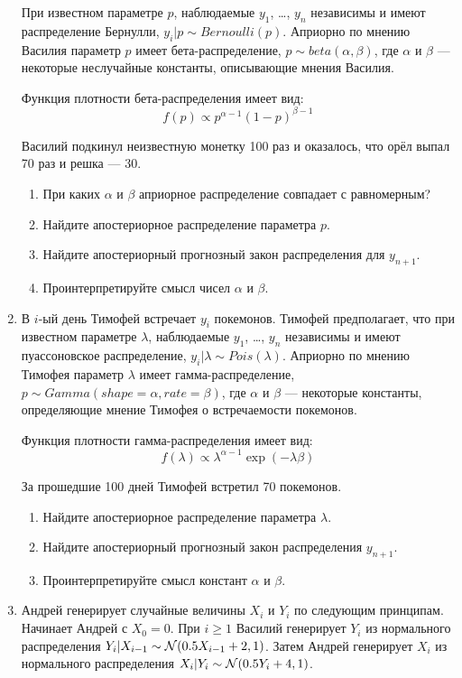 \documentclass[12pt, a4paper]{article}
\begin{document}
\begin{enumerate}
При известном параметре $p$, наблюдаемые $y_1$, \ldots, $y_n$ независимы и имеют распределение Бернулли, $y_i|p \sim Bernoulli(p)$. Априорно по мнению Василия параметр $p$ имеет бета-распределение, $p \sim beta(\alpha, \beta)$, где $\alpha$ и $\beta$ — некоторые неслучайные константы, описывающие мнения Василия.

Функция плотности бета-распределения имеет вид:
\[
f(p) \propto p^{\alpha - 1}(1-p)^{\beta-1}
\]

Василий подкинул неизвестную монетку 100 раз и оказалось, что орёл выпал 70 раз и решка — 30.

\begin{enumerate}
  \item При каких $\alpha$ и $\beta$ априорное распределение совпадает с равномерным?
  \item Найдите апостериорное распределение параметра $p$.
  \item Найдите апостериорный прогнозный закон распределения для $y_{n+1}$.
  \item Проинтерпретируйте смысл чисел $\alpha$ и $\beta$.
\end{enumerate}

\item В $i$-ый день Тимофей встречает $y_i$ покемонов. Тимофей предполагает, что при известном параметре $\lambda$, наблюдаемые $y_1$, \ldots, $y_n$ независимы и имеют пуассоновское распределение, $y_i|\lambda \sim Pois(\lambda)$. Априорно по мнению Тимофея параметр $\lambda$ имеет гамма-распределение, $p \sim Gamma(shape=\alpha, rate=\beta)$, где $\alpha$ и $\beta$ — некоторые константы, определяющие мнение Тимофея о встречаемости покемонов.

Функция плотности гамма-распределения имеет вид:
\[
f(\lambda) \propto \lambda^{\alpha - 1}\exp(-\lambda\beta)
\]

За прошедшие 100 дней Тимофей встретил 70 покемонов.


\begin{enumerate}
  \item Найдите апостериорное распределение параметра $\lambda$.
  \item Найдите апостериорный прогнозный закон распределения $y_{n+1}$.
  \item Проинтерпретируйте смысл констант $\alpha$ и $\beta$.
\end{enumerate}


\item Андрей генерирует случайные величины $X_i$ и $Y_i$ по следующим принципам. Начинает Андрей с $X_0=0$. При $i\geq 1$ Василий генерирует $Y_i$ из нормального распределения $Y_i|X_{i-1}\sim \mathcal{N}(0.5X_{i-1} + 2, 1)$. Затем Андрей генерирует $X_i$ из нормального распределения $X_i|Y_i \sim \mathcal{N}(0.5Y_i+4, 1)$.


\end{enumerate}
\end{document}
